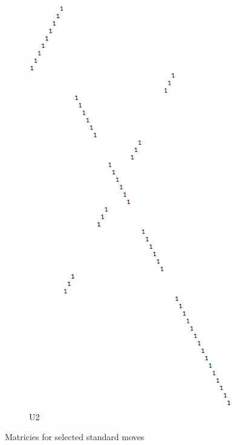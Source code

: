 \documentclass[11pt, oneside]{article}
\theoremstyle{plain}
\begin{document}
\begin{figure}[h!]
\begin{subfigure}[h]{0.4 \textwidth}
        \includegraphics[scale=0.30]{U2}
        \caption{U2}
    \end{subfigure}
    \caption{Matricies for selected standard moves}
\end{figure}

\newpage
\end{document}
